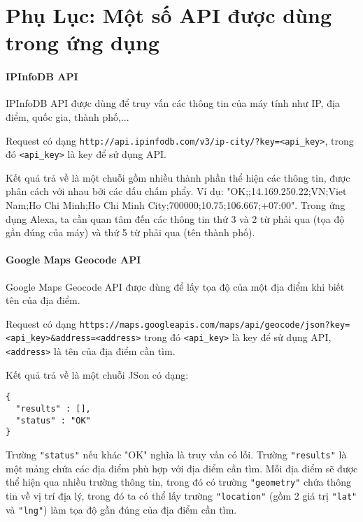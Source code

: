 \newpage
\chapter*{Phụ Lục: Một số API được dùng trong ứng dụng}

\subsubsection{IPInfoDB API}

IPInfoDB API được dùng để truy vấn các thông tin của máy tính như IP, địa điểm, quốc gia, thành phố,...

Request có dạng \lstinline{http://api.ipinfodb.com/v3/ip-city/?key=<api_key>}, trong đó \lstinline{<api_key>} là key để sử dụng API.

Kết quả trả về là một chuỗi gồm nhiều thành phần thể hiện các thông tin, được phân cách với nhau bởi các dấu chấm phẩy. Ví dụ: "OK;;14.169.250.22;VN;Viet Nam;Ho Chi Minh;Ho Chi Minh City;700000;10.75;106.667;+07:00". Trong ứng dụng Alexa, ta cần quan tâm đến các thông tin thứ 3 và 2 từ phải qua (tọa độ gần đúng của máy) và thứ 5 từ phải qua (tên thành phố).

\subsubsection{Google Maps Geocode API}

Google Maps Geocode API được dùng để lấy tọa độ của một địa điểm khi biết tên của địa điểm.

Request có dạng \lstinline{https://maps.googleapis.com/maps/api/geocode/json?key=<api_key>&address=<address>} trong đó \lstinline{<api_key>} là key để sử dụng API, \lstinline{<address>} là tên của địa điểm cần tìm.

Kết quả trả về là một chuỗi JSon có dạng:

\begin{lstlisting}
{
  "results" : [],
  "status" : "OK"
}
\end{lstlisting}

Trường \lstinline{"status"} nếu khác "OK" nghĩa là truy vấn có lỗi. Trường \lstinline{"results"} là một mảng chứa các địa điểm phù hợp với địa điểm cần tìm. Mỗi địa điểm sẽ được thể hiện qua nhiều trường thông tin, trong đó có trường \lstinline{"geometry"} chứa thông tin về vị trí địa lý, trong đó ta có thể lấy trường \lstinline{"location"} (gồm 2 giá trị \lstinline{"lat"} và \lstinline{"lng"}) làm tọa độ gần đúng của địa điểm cần tìm.

